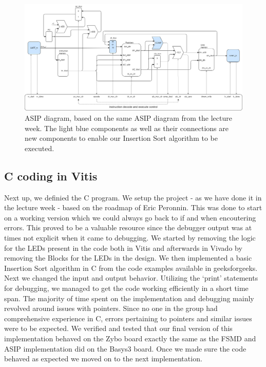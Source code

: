 \documentclass[conference]{IEEEtran}
\begin{document}
\begin{figure}
    \centering
    \includegraphics[width=1\linewidth]{Images/ASIP.png}
    \caption{ASIP diagram, based on the same ASIP diagram from the lecture week. The light blue components as well as their connections are new components to enable our Insertion Sort algorithm to be executed.}
    \label{fig:asip}
\end{figure}

\subsection{C coding in Vitis}
Next up, we definied the C program. We setup the project - as we have done it in the lecture week - based on the roadmap of Eric Peronnin. This was done to start on a working version which we could always go back to if and when encoutering errors. This proved to be a valuable resource since the debugger output was at times not explicit when it came to debugging. We started by removing the logic for the LEDs present in the code both in Vitis and afterwards in Vivado by removing the Blocks for the LEDs in the design. We then implemented a basic Insertion Sort algorithm in C from the code examples available in geeksforgeeks\cite{g4g}. Next we changed the input and output behavior. Utilizing the `print' statements for debugging, we managed to get the code working efficiently in a short time span. The majority of time spent on the implementation and debugging mainly revolved around issues with pointers. Since no one in the group had comprehensive experience in C, errors pertaining to pointers and similar issues were to be expected. We verified and tested that our final version of this implementation behaved on the Zybo board exactly the same as the FSMD and ASIP implementation did on the Basys3 board. Once we made sure the code behaved as expected we moved on to the next implementation.
\end{document}
